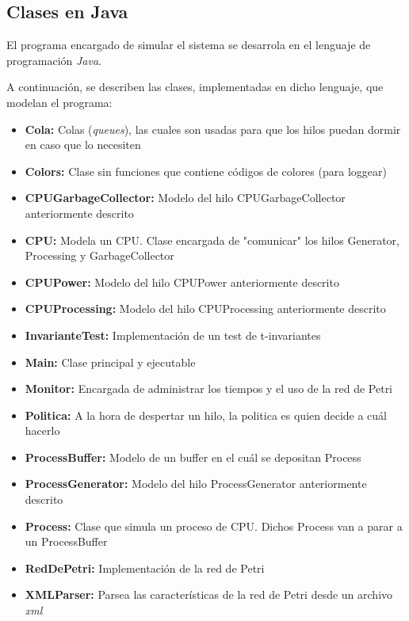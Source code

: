 \documentclass{article}
\begin{document}
    \subsection{Clases en Java}
    El programa encargado de simular el sistema se desarrola en el lenguaje de programación
    \emph{Java}. \par
    A continuación, se describen las clases, implementadas en dicho lenguaje,
    que modelan el programa:
    \begin{itemize}
        \item \textbf{Cola:} Colas (\emph{queues}), las cuales son usadas para que los
        hilos puedan dormir en caso que lo necesiten
        \item \textbf{Colors:} Clase sin funciones que contiene códigos de colores (para 
        loggear)
        \item \textbf{CPUGarbageCollector:} Modelo del hilo CPUGarbageCollector anteriormente
        descrito
        \item \textbf{CPU:} Modela un CPU. Clase encargada de "comunicar" los hilos Generator,
        Processing y GarbageCollector
        \item \textbf{CPUPower:} Modelo del hilo CPUPower anteriormente descrito
        \item \textbf{CPUProcessing:} Modelo del hilo CPUProcessing anteriormente descrito
        \item \textbf{InvarianteTest:} Implementación de un test de t-invariantes
        \item \textbf{Main:} Clase principal y ejecutable
        \item \textbf{Monitor:} Encargada de administrar los tiempos y el uso de la red de 
        Petri
        \item \textbf{Politica:} A la hora de despertar un hilo, la politica es quien decide
        a cuál hacerlo
        \item \textbf{ProcessBuffer:} Modelo de un buffer en el cuál se depositan Process
        \item \textbf{ProcessGenerator:} Modelo del hilo ProcessGenerator anteriormente
        descrito
        \item \textbf{Process:} Clase que simula un proceso de CPU. Dichos Process van a
        parar a un ProcessBuffer
        \item \textbf{RedDePetri:} Implementación de la red de Petri
        \item \textbf{XMLParser:} Parsea las características de la red de Petri desde un
        archivo \emph{xml}
    \end{itemize} \par
\end{document}
